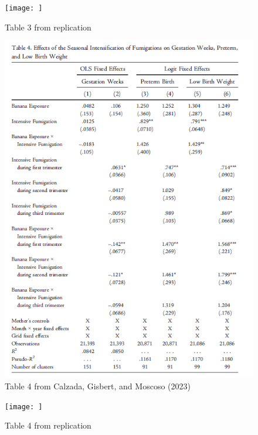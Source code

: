 \documentclass[hyperref={pdfpagelabels=false}]{beamer}
\begin{document}
 \begin{frame}{}

\begin{figure}
    \centering
    \texttt{[image: ]}
    \caption{Table 3 from  replication}
    \label{fig:enter-label}
\end{figure}

    
\end{frame}

 \begin{frame}{}

\begin{figure}
    \centering
    \includegraphics[scale=0.4]{figures-paper/table4.png}
    \caption{Table 4 from Calzada, Gisbert, and Moscoso (2023)}
    \label{fig:enter-label}
\end{figure}

    
\end{frame}


 \begin{frame}{}

\begin{figure}
    \centering
    \texttt{[image: ]}
    \caption{Table 4 from  replication}
    \label{fig:enter-label}
\end{figure}

    
\end{frame}
\end{document}
